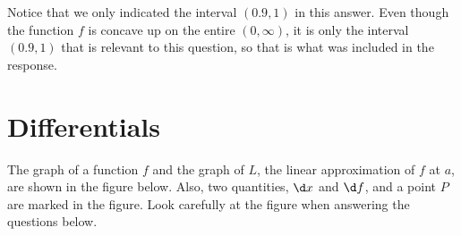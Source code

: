 \documentclass{ximera}
\begin{document}
Notice that we only indicated the interval $(0.9, 1)$ in this answer. Even though the function $f$ is concave up on the entire $(0, \infty)$, it is only the 
interval $(0.9, 1)$ that is relevant to this question, so that is what was included in the response.




\section{Differentials}

The  graph of a function $f$ and the graph of $L$, the linear approximation of $f$ at $a$, are shown in the figure below.
Also, two quantities, $\d x$ and $\d f$, and a point $P$ are marked in the figure. Look carefully at the figure when answering the questions below.
\end{document}
